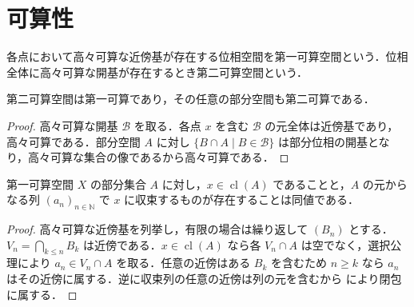 \section{可算性}
\begin{defn}[第一可算性と第二可算性]
各点において高々可算な近傍基が存在する位相空間を第一可算空間という．位相全体に高々可算な開基が存在するとき第二可算空間という．
\end{defn}
\begin{prop}[第二可算性から第一可算性]
第二可算空間は第一可算であり，その任意の部分空間も第二可算である．
\end{prop}
\begin{proof}
高々可算な開基 $\mathcal B$ を取る．各点 $x$ を含む $\mathcal B$ の元全体は近傍基であり，高々可算である．部分空間 $A$ に対し $\{B\cap A\mid B\in\mathcal B\}$ は部分位相の開基となり，高々可算な集合の像であるから高々可算である．
\end{proof}
\begin{prop}[第一可算空間の列による閉包]
第一可算空間 $X$ の部分集合 $A$ に対し，$x\in\operatorname{cl}(A)$ であることと，$A$ の元からなる列 $(a_n)_{n\in\mathbb N}$ で $x$ に収束するものが存在することは同値である．
\end{prop}
\begin{proof}
高々可算な近傍基を列挙し，有限の場合は繰り返して $(B_n)$ とする．$V_n=\bigcap_{k\leq n}B_k$ は近傍である．$x\in\operatorname{cl}(A)$ なら各 $V_n\cap A$ は空でなく，選択公理により $a_n\in V_n\cap A$ を取る．任意の近傍はある $B_k$ を含むため $n\geq k$ なら $a_n$ はその近傍に属する．逆に収束列の任意の近傍は列の元を含むから  により閉包に属する．
\end{proof}
